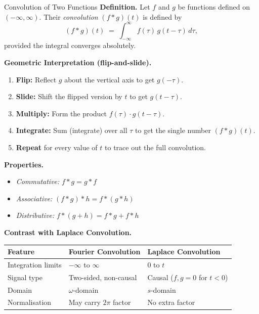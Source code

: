 \documentclass[12pt,a4paper]{article}
\begin{document}
\begin{infobox}{Convolution of Two Functions}
\textbf{Definition.} Let $f$ and $g$ be functions defined on $(-\infty,\infty)$.
Their \emph{convolution} $(f*g)(t)$ is defined by
\[
  (f * g)(t) \;=\; \int_{-\infty}^{\infty} f(\tau)\,g(t-\tau)\,d\tau,
\]
provided the integral converges absolutely.

\medskip
\textbf{Geometric Interpretation (flip-and-slide).}
\begin{enumerate}[label=\arabic*.]
  \item \textbf{Flip:} Reflect $g$ about the vertical axis to get $g(-\tau)$.
  \item \textbf{Slide:} Shift the flipped version by $t$ to get $g(t-\tau)$.
  \item \textbf{Multiply:} Form the product $f(\tau)\cdot g(t-\tau)$.
  \item \textbf{Integrate:} Sum (integrate) over all $\tau$ to get the single
        number $(f*g)(t)$.
  \item \textbf{Repeat} for every value of $t$ to trace out the full convolution.
\end{enumerate}

\medskip
\textbf{Properties.}
\begin{itemize}
  \item \emph{Commutative:} $f*g = g*f$
  \item \emph{Associative:} $(f*g)*h = f*(g*h)$
  \item \emph{Distributive:} $f*(g+h) = f*g + f*h$
\end{itemize}

\medskip
\textbf{Contrast with Laplace Convolution.}
\begin{center}
\begin{tabular}{lll}
\toprule
Feature & Fourier Convolution & Laplace Convolution \\
\midrule
Integration limits & $-\infty$ to $\infty$ & $0$ to $t$ \\
Signal type & Two-sided, non-causal & Causal ($f,g=0$ for $t<0$) \\
Domain & $\omega$-domain & $s$-domain \\
Normalisation & May carry $2\pi$ factor & No extra factor \\
\bottomrule
\end{tabular}
\end{center}
\end{infobox}

\end{document}
